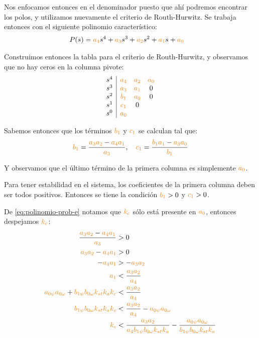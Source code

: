 Nos enfocamos entonces en el denominador puesto que ahí podremos encontrar los
polos, y utilizamos nuevamente el criterio de Routh-Hurwitz. Se trabaja entonces
con el siguiente polinomio característico:
\begin{align}\label{eq:polinomio-prob-e}
    P(s) = \nara{a_4} s^4 + \nara{a_3} s^3 + \nara{a_2} s^2 + \nara{a_1} s + \nara{a_0} &
\end{align}

Construimos entonces la tabla para el criterio de Routh-Hurwitz, y observamos
que no hay ceros en la columna pivote:
\begin{equation}
  \begin{array}{c|ccc}
    s^4 & \nara{a_4} & \nara{a_2} & \nara{a_0} \\
    s^3 & \nara{a_3} & \nara{a_1} & 0\\
    s^2 & \nara{b_1} & \nara{a_0} & 0\\
    s^1 & \nara{c_1} & 0 \\
    s^0 & \nara{a_0} & 
  \end{array}
\end{equation}

Sabemos entonces que los términos $\nara{b_1}$ y $\nara{c_1}$ se calculan tal
que:
\begin{equation}
  \nara{b_1} = \frac{\nara{a_3 a_2} - \nara{a_4 a_1}}{\nara{a_3}},
  \quad \nara{c_1} = \frac{\nara{b_1 a_1} - \nara{a_3 a_0}}{\nara{b_1}}
\end{equation}

Y observamos que el último término de la primera columna es simplemente $\nara{a_0}$.

Para tener estabilidad en el sistema, los coeficientes de la primera columna
deben ser todos positivos. Entonces se tiene la condición $\nara{b_{1}} > 0$
y $\nara{c_{1}} > 0$.

De \eqref{eq:polinomio-prob-e} notamos que $\nara{k_{c}}$ sólo está presente
en $\nara{a_{0}}$, entonces despejamos $\nara{k_{c}}$:
\begin{align} 
  \frac{\nara{a_3 a_2} - \nara{a_4 a_1}}{\nara{a_3}} &> 0 \\
  \nara{a_3 a_2} - \nara{a_4 a_1} &> 0 \\
  - \nara{a_4 a_1} &> - \nara{a_3 a_2} \\
  \nara{a_1} &< \frac{\nara{a_3 a_2}}{\nara{a_4}} \\
  \nara{a_{0\psi} a_{0\omega}} + \nara{b_{1\psi} b_{0\omega} k_{st} k_a k_c} &< \frac{\nara{a_3 a_2}}{\nara{a_4}} \\
  \nara{b_{1\psi} b_{0\omega} k_{st} k_a k_c} &< \frac{\nara{a_3 a_2}}{\nara{a_4}} - \nara{a_{0\psi} a_{0\omega}} \\
  \nara{k_c}  &< \frac{\nara{a_3 a_2}}{\nara{a_4 b_{1\psi} b_{0\omega} k_{st} k_a}}  - \frac{\nara{a_{0\psi} a_{0\omega}}}{\nara{b_{1\psi} b_{0\omega} k_{st} k_a}}  \\
\end{align}

